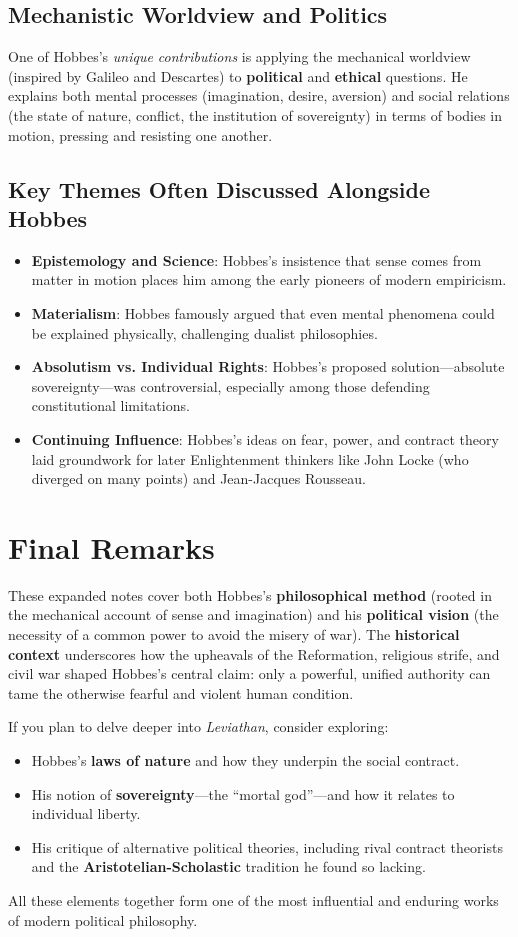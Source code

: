 \subsection*{Mechanistic Worldview and Politics}
One of Hobbes’s \textit{unique contributions} is applying the mechanical worldview (inspired by Galileo and Descartes) to \textbf{political} and \textbf{ethical} questions. He explains both mental processes (imagination, desire, aversion) and social relations (the state of nature, conflict, the institution of sovereignty) in terms of bodies in motion, pressing and resisting one another.

\subsection*{Key Themes Often Discussed Alongside Hobbes}
\begin{itemize}
  \item \textbf{Epistemology and Science}: Hobbes’s insistence that sense comes from matter in motion places him among the early pioneers of modern empiricism.
  \item \textbf{Materialism}: Hobbes famously argued that even mental phenomena could be explained physically, challenging dualist philosophies.
  \item \textbf{Absolutism vs. Individual Rights}: Hobbes’s proposed solution---absolute sovereignty---was controversial, especially among those defending constitutional limitations.
  \item \textbf{Continuing Influence}: Hobbes’s ideas on fear, power, and contract theory laid groundwork for later Enlightenment thinkers like John Locke (who diverged on many points) and Jean-Jacques Rousseau.
\end{itemize}

\section*{Final Remarks}
These expanded notes cover both Hobbes’s \textbf{philosophical method} (rooted in the mechanical account of sense and imagination) and his \textbf{political vision} (the necessity of a common power to avoid the misery of war). The \textbf{historical context} underscores how the upheavals of the Reformation, religious strife, and civil war shaped Hobbes’s central claim: only a powerful, unified authority can tame the otherwise fearful and violent human condition.

If you plan to delve deeper into \textit{Leviathan}, consider exploring:
\begin{itemize}
  \item Hobbes’s \textbf{laws of nature} and how they underpin the social contract.
  \item His notion of \textbf{sovereignty}---the “mortal god”---and how it relates to individual liberty.
  \item His critique of alternative political theories, including rival contract theorists and the \textbf{Aristotelian-Scholastic} tradition he found so lacking.
\end{itemize}

All these elements together form one of the most influential and enduring works of modern political philosophy.
